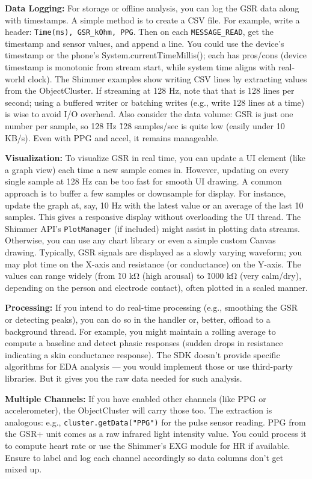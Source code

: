 {{\textbf{Data Logging:} For storage or offline analysis, you can log the GSR
data along with timestamps. A simple method is to create a CSV file. For
example, write a header: \texttt{Time(ms), GSR_kOhm, PPG}. Then on each
\texttt{MESSAGE_READ}, get the timestamp and sensor values, and append a line.
You could use the device's timestamp or the phone's
System.currentTimeMillis(); each has pros/cons (device timestamp is
monotonic from stream
start\cite{ref24},
while system time aligns with real-world clock). The Shimmer examples
show writing CSV lines by extracting values from the
ObjectCluster\cite{ref23}\cite{ref29}.
If streaming at 128 Hz, note that that is 128 lines per second; using a
buffered writer or batching writes (e.g., write 128 lines at a time) is
wise to avoid I/O overhead. Also consider the data volume: GSR is just
one number per sample, so 128 Hz \~ 128 samples/sec is quite low (easily
under 10 KB/s). Even with PPG and accel, it remains manageable.

\textbf{Visualization:} To visualize GSR in real time, you can update a UI
element (like a graph view) each time a new sample comes in. However,
updating on every single sample at 128 Hz can be too fast for smooth UI
drawing. A common approach is to buffer a few samples or downsample for
display. For instance, update the graph at, say, 10 Hz with the latest
value or an average of the last 10 samples. This gives a responsive
display without overloading the UI thread. The Shimmer API's
\texttt{PlotManager} (if included) might assist in plotting data
streams\cite{ref30}.
Otherwise, you can use any chart library or even a simple custom Canvas
drawing. Typically, GSR signals are displayed as a slowly varying
waveform; you may plot time on the X-axis and resistance (or
conductance) on the Y-axis. The values can range widely (from \~10 kΩ
(high arousal) to \~1000 kΩ (very calm/dry), depending on the person and
electrode contact), often plotted in a scaled manner.

\textbf{Processing:} If you intend to do real-time processing (e.g.,
smoothing the GSR or detecting peaks), you can do so in the handler or,
better, offload to a background thread. For example, you might maintain
a rolling average to compute a baseline and detect phasic responses
(sudden drops in resistance indicating a skin conductance response). The
SDK doesn't provide specific algorithms for EDA analysis --- you would
implement those or use third-party libraries. But it gives you the raw
data needed for such analysis.

\textbf{Multiple Channels:} If you have enabled other channels (like PPG or
accelerometer), the ObjectCluster will carry those too. The extraction
is analogous: e.g., \texttt{cluster.getData("PPG")} for the pulse sensor
reading. PPG from the GSR+ unit comes as a raw infrared light intensity
value. You could process it to compute heart rate or use the Shimmer's
EXG module for HR if available. Ensure to label and log each channel
accordingly so data columns don't get mixed up.

}}

